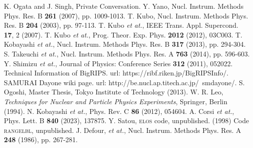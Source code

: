 \begin{thebibliography}{999}
K. Ogata and J. Singh, Private Conversation.
Y. Yano, Nucl. Instrum. Methods Phys. Res. B \textbf{261} (2007), pp. 1009-1013.
T. Kubo, Nucl. Instrum. Methods Phys. Res. B \textbf{204} (2003), pp. 97-113.
T. Kubo \textit{et at.}, IEEE Trans. Appl. Supercond. \textbf{17}, 2 (2007).
T. Kubo \textit{et at.}, Prog. Theor. Exp. Phys. \textbf{2012} (2012), 03C003.
T. Kobayashi \textit{et at.}, Nucl. Instrum. Methods Phys. Res. B \textbf{317} (2013), pp. 294-304.
S. Takeuchi \textit{et at.}, Nucl. Instrum. Methods Phys. Res. A \textbf{763} (2014), pp. 596-603.
Y. Shimizu \textit{et at.}, Journal of Physics: Conference Series \textbf{312} (2011), 052022.
Technical Information of BigRIPS. url: https://ribf.riken.jp/BigRIPSInfo/.
SAMURAI Dayone wiki page. url: http://be.nucl.ap.titech.ac.jp/~smdayone/.
S. Ogoshi, Master Thesis, Tokyo Institute of Technology (2013).
W. R. Leo, \textit{Techniques for Nuclear and Particle Physics Experiments}, Springer, Berlin (1994).
N. Kobayashi \textit{et at.}, Phys. Rev. C \textbf{86} (2012), 054604.
A. Corsi \textit{et at.}, Phys. Lett. B \textbf{840} (2023), 137875.
Y. Satou, \textsc{elos} code, unpublished. (1998)
Code \textsc{rangelbl}, unpublished.
J. Defour, \textit{et at.}, Nucl. Instrum. Methods Phys. Res. A \textbf{248} (1986), pp. 267-281.

\end{thebibliography}